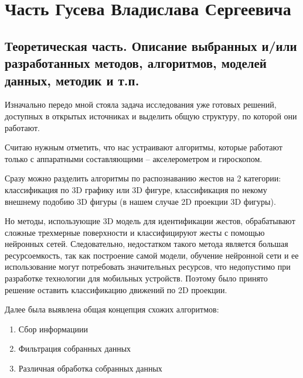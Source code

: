 



\section{Часть Гусева Владислава Сергеевича}

\subsection{Теоретическая часть. Описание выбранных и/или разработанных методов, алгоритмов, моделей данных, методик и т.п.}
Изначально передо мной стояла задача исследования уже готовых решений, доступных в открытых источниках и выделить общую структуру, по которой они работают.

Считаю нужным отметить, что нас устраивают алгоритмы, которые работают только с аппаратными составляющими – акселерометром и гироскопом.

Сразу можно разделить алгоритмы по распознаванию жестов на 2 категории: классификация по 3D графику или 3D фигуре, классификация по некому внешнему подобию 3D фигуры (в нашем случае 2D проекции 3D фигуры).

Но методы, использующие 3D модель для идентификации жестов, обрабатывают сложные трехмерные поверхности и классифицируют жесты с помощью нейронных сетей. Следовательно, недостатком такого метода является большая ресурсоемкость, так как построение самой модели, обучение нейронной сети и ее использование могут потребовать значительных ресурсов, что недопустимо при разработке технологии для мобильных устройств. Поэтому было принято решение оставить классификацию движений по 2D проекции.

Далее была выявлена общая концепция схожих алгоритмов:
\begin{enumerate}
    \item{Сбор информациии}
    \item {Фильтрация собранных данных}
    \item {Различная обработка собранных данных}
\end{enumerate}

